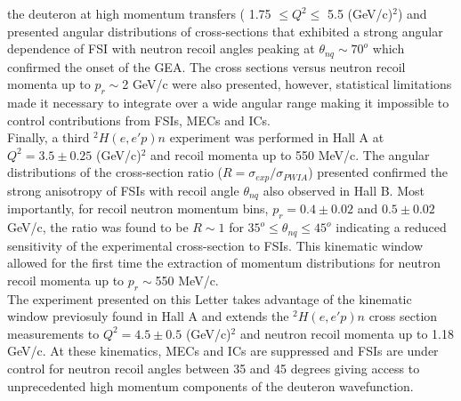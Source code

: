 the deuteron at high momentum transfers ( 1.75 $\leq Q^{2}\leq$ 5.5 (GeV/c)$^{2}$) and presented angular distributions of cross-sections that exhibited a strong angular dependence of FSI with neutron recoil angles peaking
at $\theta_{nq} \sim 70^{o}$ which confirmed the onset of the GEA\cite{Sargsian_2001,PhysRevC.56.1124}.
The cross sections versus neutron recoil momenta up to $p_{r}\sim$2 GeV/c were also presented, however, statistical limitations made it necessary to integrate over a wide angular range making it impossible to control
contributions from FSIs, MECs and ICs. \\
\indent Finally, a third $^{2}H(e,e'p)n$ experiment was performed in Hall A \cite{PhysRevLett.107.262501} at $Q^{2} = 3.5\pm0.25$ (GeV/c)$^{2}$ and recoil momenta up to 550 MeV/c. The angular distributions of
the cross-section ratio ($R = \sigma_{exp}/\sigma_{PWIA}$) presented confirmed the strong anisotropy of FSIs with recoil angle $\theta_{nq}$ also observed in Hall B\cite{PhysRevLett.98.262502}. Most importantly, for recoil
neutron momentum bins, $p_{r}=0.4\pm0.02$ and $0.5\pm0.02$ GeV/c, the ratio was found to be $R\sim1$ for $35^{o}\leq \theta_{nq}\leq45^{o}$ indicating a reduced sensitivity of the experimental
cross-section to FSIs. This kinematic window allowed for the first time the extraction of momentum distributions for neutron recoil momenta up to $p_{r}\sim$550 MeV/c. \\
\indent The experiment presented on this Letter takes advantage of the kinematic window previosuly found in Hall A\cite{PhysRevLett.107.262501} and extends the $^{2}H(e,e'p)n$ cross section measurements
to $Q^{2}=4.5\pm0.5$ (GeV/c)$^{2}$ and neutron recoil momenta up to 1.18 GeV/c. At these kinematics, MECs and ICs are suppressed and FSIs are under control for neutron recoil angles between 35 and 45 degrees
giving access to unprecedented high momentum components of the deuteron wavefunction. \\
